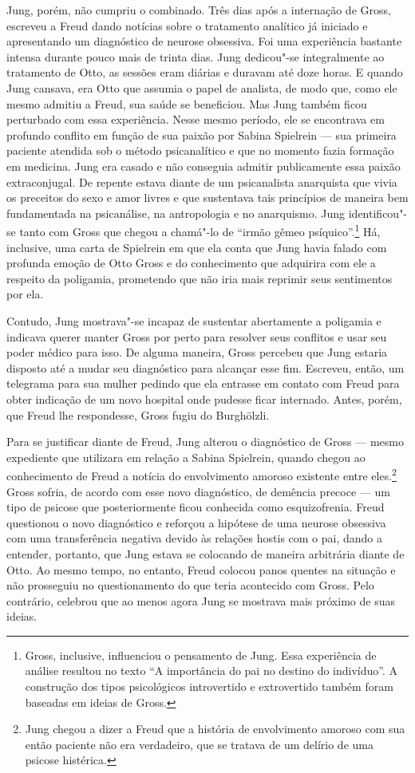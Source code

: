 Jung, porém, não cumpriu o combinado. Três dias após a internação de
Gross, escreveu a Freud dando notícias sobre o tratamento analítico já
iniciado e apresentando um diagnóstico de neurose obsessiva. Foi uma
experiência bastante intensa durante pouco mais de trinta dias. Jung
dedicou"-se integralmente ao tratamento de Otto, as sessões eram diárias
e duravam até doze horas. E quando Jung cansava, era Otto que assumia o
papel de analista, de modo que, como ele mesmo admitiu a Freud, sua
saúde se beneficiou. Mas Jung também ficou perturbado com essa
experiência. Nesse mesmo período, ele se encontrava em profundo conflito
em função de sua paixão por Sabina Spielrein --- sua primeira paciente
atendida sob o método psicanalítico e que no momento fazia formação em
medicina. Jung era casado e não conseguia admitir publicamente essa
paixão extraconjugal. De repente estava diante de um psicanalista
anarquista que vivia os preceitos do sexo e amor livres e que sustentava
tais princípios de maneira bem fundamentada na psicanálise, na
antropologia e no anarquismo. Jung identificou"-se tanto com Gross que
chegou a chamá"-lo de ``irmão gêmeo psíquico''.\footnote{Gross, inclusive,
  influenciou o pensamento de Jung. Essa experiência de análise resultou
  no texto ``A importância do pai no destino do indivíduo''. A
  construção dos tipos psicológicos introvertido e extrovertido também
  foram baseadas em ideias de Gross.} Há, inclusive, uma carta de
Spielrein em que ela conta que Jung havia falado com profunda emoção de
Otto Gross e do conhecimento que adquirira com ele a respeito da
poligamia, prometendo que não iria mais reprimir seus sentimentos por
ela.

Contudo, Jung mostrava"-se incapaz de sustentar abertamente a poligamia e
indicava querer manter Gross por perto para resolver seus conflitos e
usar seu poder médico para isso. De alguma maneira, Gross percebeu que
Jung estaria disposto até a mudar seu diagnóstico para alcançar esse
fim. Escreveu, então, um telegrama para sua mulher pedindo que ela
entrasse em contato com Freud para obter indicação de um novo hospital
onde pudesse ficar internado. Antes, porém, que Freud lhe respondesse,
Gross fugiu do Burghölzli.

Para se justificar diante de Freud, Jung alterou o diagnóstico de Gross
--- mesmo expediente que utilizara em relação a Sabina Spielrein, quando
chegou ao conhecimento de Freud a notícia do envolvimento amoroso
existente entre eles.\footnote{Jung chegou a dizer a Freud que a história
  de envolvimento amoroso com sua então paciente não era verdadeiro, que
  se tratava de um delírio de uma psicose histérica.} Gross sofria, de
acordo com esse novo diagnóstico, de demência precoce --- um tipo de
psicose que posteriormente ficou conhecida como esquizofrenia. Freud
questionou o novo diagnóstico e reforçou a hipótese de uma neurose
obsessiva com uma transferência negativa devido às relações hostis com o
pai, dando a entender, portanto, que Jung estava se colocando de maneira
arbitrária diante de Otto. Ao mesmo tempo, no entanto, Freud colocou
panos quentes na situação e não prosseguiu no questionamento do que
teria acontecido com Gross. Pelo contrário, celebrou que ao menos agora
Jung se mostrava mais próximo de suas ideias.

